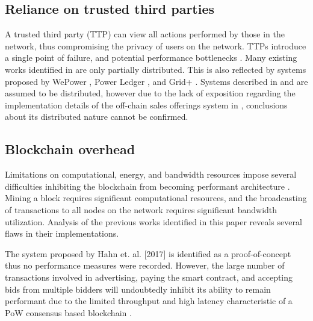 \subsection{Reliance on trusted third parties}

A trusted third party (TTP) can view all actions performed by those in the network, thus compromising the privacy of users on the network. TTPs introduce a single point of failure, and potential performance bottlenecks \cite{spb}. Many existing works identified in \cite{spb} are only partially distributed. This is also reflected by systems proposed by WePower \cite{WeP17}, Power Ledger \cite{Led18}, and Grid+ \cite{Gril18}. Systems described in \cite{HSLC17} and \cite{Huk18} are assumed to be distributed, however due to the lack of exposition regarding the implementation details of the off-chain sales offerings system in 
\cite{Huk18}, conclusions about its distributed nature cannot be confirmed.

\subsection{Blockchain overhead}

Limitations on computational, energy, and bandwidth resources impose several difficulties inhibiting the blockchain from becoming performant architecture \cite[p.2]{spb}. Mining a block requires significant computational resources, and the broadcasting of transactions to all nodes on the network requires significant bandwidth utilization. Analysis of the previous works identified in this paper reveals several flaws in their implementations.

The system proposed by Hahn et. al. [2017] is identified as a proof-of-concept \cite[p.2]{HSLC17} thus no performance measures were recorded. However, the large number of transactions involved in advertising, paying the smart contract, and accepting bids from multiple bidders \cite[p.3]{HSLC17} will undoubtedly inhibit its ability to remain performant due to the limited throughput and high latency characteristic of a PoW consensus based blockchain \cite[p.4]{Vuk16}.

